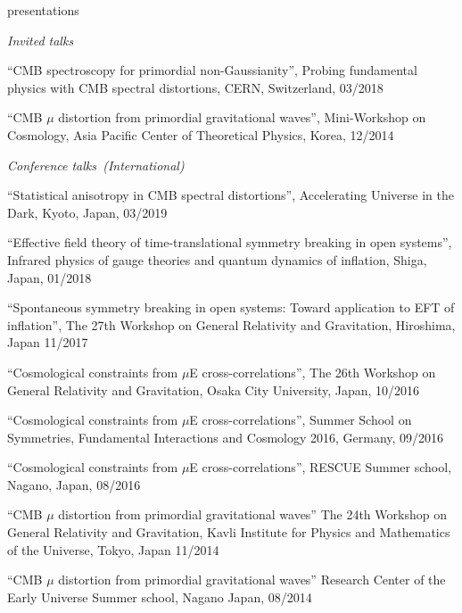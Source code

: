 \documentclass[a4paper]{resume} %
\begin{document}
\begin{rSection}{presentations}

\noindent\textit{Invited talks}
\begin{etaremune}
	 \item
``CMB spectroscopy for primordial non-Gaussianity'', Probing fundamental physics with CMB spectral distortions, CERN, Switzerland, 03/2018
    \item 
``CMB $\mu$ distortion from primordial gravitational waves'', Mini-Workshop on Cosmology, Asia Pacific Center of Theoretical Physics, Korea, 12/2014
\end{etaremune}

\noindent\textit{Conference talks~(International)}

\begin{etaremune}
	\item
	``Statistical anisotropy in CMB spectral distortions'', Accelerating Universe in the Dark, Kyoto, Japan, 03/2019
	\item
    ``Effective field theory of time-translational symmetry breaking in open systems'', Infrared physics of gauge theories and quantum dynamics of inflation, Shiga, Japan, 01/2018
    
    \item
    ``Spontaneous symmetry breaking in open systems: Toward application to EFT of inflation'', The 27th Workshop on General Relativity and Gravitation, Hiroshima, Japan 11/2017
    \item
    ``Cosmological constraints from $\mu$E cross-correlations'', The 26th Workshop on General Relativity and Gravitation, Osaka City University, Japan, 10/2016
    \item
    ``Cosmological constraints from $\mu$E cross-correlations'', Summer School on Symmetries, Fundamental Interactions and Cosmology 2016, Germany, 09/2016
    \item
    ``Cosmological constraints from $\mu$E cross-correlations'', RESCUE Summer school, Nagano, Japan, 08/2016
    \item
``CMB $\mu$ distortion from primordial gravitational waves'' The 24th Workshop on General Relativity and Gravitation, Kavli Institute for Physics and Mathematics of the Universe, Tokyo, Japan 11/2014     
    \item 
    ``CMB $\mu$ distortion from primordial gravitational waves'' Research Center of the Early Universe Summer school, Nagano Japan, 08/2014
    
        
\end{etaremune}


\end{rSection}
\end{document}
